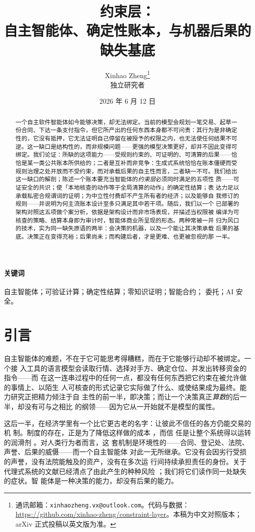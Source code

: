 \documentclass[11pt,UTF8]{ctexart}
\title{\heiti 约束层：\\[3pt]
  自主智能体、确定性账本，与机器后果的缺失基底}
\author{%
  Xinhao Zheng\thanks{通讯邮箱：\texttt{xinhaozheng.vx@outlook.com}。代码与数据：
    \url{https://github.com/xinhao-zheng/constraint-layer}。本稿为中文对照版本；arXiv 正式投稿以英文版为准。}\\[2pt]
  \small 独立研究者}
\date{2026 年 6 月 12 日}
\begin{document}
\maketitle

\begin{abstract}
\noindent
一个自主软件智能体如今能够决策，却无法绑定。当前的模型会规划一笔交易、起草一
份合同、下达一条支付指令，但它所产出的任何东西本身都不可问责：其行为是非确定
性的，它没有抵押，它无法证明自己停留在被授予的权限之内，也无法使任何结果不可
逆。这一缺口是结构性的，而非规模问题——更强的模型决策更好，却并不因此变得可
绑定。我们论证：所缺的这项能力——受规则约束的、可证明的、可清算的后果——恰
恰是某一类公共账本所供给的；二者是互补而非竞争：生成式系统恰恰在账本僵硬而受
规则治理之处开放而不受约束，而对承载后果的自主性而言，二者缺一不可。我们给出
这一缺口的解剖；陈述一个账本要充当智能体的\emph{约束层}必须同时满足的五项性
质——可证安全的共识；使「本地核查的动作等于全局清算的动作」的确定性结算；表
达力足以承载私密合规谓词的证明；为中立性付费却不产生所有者的经济；以及能够自
我修订的规则——并说明为何主流账本设计至多只满足其中若干项。随后，我们以一个
已部署的架构对照这五项做个案分析，依据是架构设计而非市场表现，并描述当权限被
编译为可核查的策略、结算本身即为审计时，智能体商业所呈现的形态。两种常被一并
归为风口的技术，实为同一缺失原语的两半：会决策的机器，以及一个能让其决策承载
后果的基底。决策正在变得充裕；后果尚未；而构建后者，才是更难、也更被忽视的那
一半。
\end{abstract}

\paragraph*{关键词} 自主智能体；可验证计算；确定性结算；零知识证明；智能合约；
委托；AI 安全。

\section{引言}
\label{sec:intro}

自主智能体的难题，不在于它可能思考得糟糕，而在于它能够行动却不被绑定。一个接
入工具的语言模型会读取行情、选择对手方、确定仓位、并发出转移资金的指令——而
在这一连串过程中的任何一点，都没有任何东西把它约束在被允许做的事情上、以陌生
人可核查的形式记录它实际做了什么、或使结果成为最终。能力研究正把精力倾注于自
主性的前一半，即决策；而让一个决策真正\emph{算数}的后一半，却没有可与之相比
的纲领——因为它从一开始就不是模型的属性。

这后一半，在经济学里有一个比它更古老的名字：让彼此不信任的各方仍能交易的机
制。制度的存在，正是为了降低这样做的成本 \citep{north1990institutions}，而信
任是让整个系统得以运转的润滑剂 \citep{arrow1974limits}。对人类行为者而言，这
套机制是环境性的——合同、登记处、法院、声誉、后果的威慑——而一个自主智能体
对此一无所继承。它没有会因劣行受损的声誉，没有法院能触及的资产，没有在多次运
行间持续承担责任的身份。关于代理式系统的文献已经清点了由此产生的种种风险
\citep{park2023generative,chan2023harms}；我们将它们读作同一处缺失的症状。智
能体是一种决策的能力，却没有后果的能力。
\end{document}

